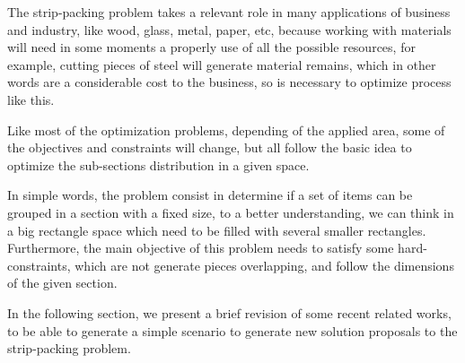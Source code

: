 The strip-packing problem takes a relevant role
in many applications of business and industry,
like wood, glass, metal, paper, etc,
because working with materials will need in
some moments a properly use of all the possible resources,
for example, cutting pieces of steel will generate material remains,
which in other words are a considerable cost to the business,
so is necessary to optimize process like this.

Like most of the optimization problems,
depending of the applied area,
some of the objectives and constraints will change,
but all follow the basic idea to optimize the
sub-sections distribution  in a given space.

In simple words, the problem consist in determine if a
set of items can be grouped in a section with a fixed size,
to a better understanding, we can think in a big rectangle
space which need to be filled with several smaller rectangles.
Furthermore, the main objective of this problem needs to
satisfy some hard-constraints, which are not generate
pieces overlapping, and follow the dimensions
of the given section.

In the following section,
we present a brief revision of some recent related works,
to be able to generate a simple scenario to generate
new solution proposals to the strip-packing problem.
